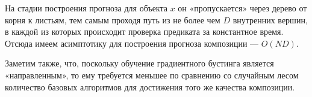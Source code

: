 \documentclass[12pt,fleqn]{article}
\begin{document}
\begin{esSolution}
На стадии построения прогноза для объекта $x$ он «пропускается» через дерево от корня к листьям, тем самым проходя путь из не более чем $D$ внутренних вершин, в каждой из которых происходит проверка предиката за константное время. Отсюда имеем асимптотику для построения прогноза композиции — $O(ND)$.

\end{esSolution}

Заметим также, что, поскольку обучение градиентного бустинга является «направленным», то ему требуется меньшее по сравнению со случайным лесом количество базовых алгоритмов для достижения того же качества композиции.
\end{document}
